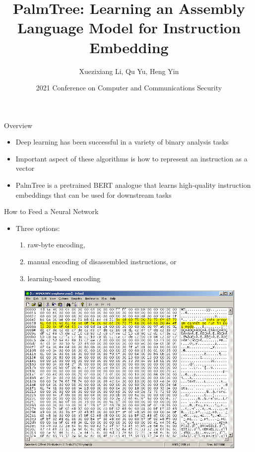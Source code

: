 \documentclass{beamer}
\title[]{PalmTree: Learning an Assembly Language Model for Instruction Embedding}
\author{Xuezixiang Li, Qu Yu, Heng Yin}
\date{2021 Conference on Computer and Communications Security}
\begin{document}
\begin{frame}
  \titlepage
\end{frame}


\begin{frame}{Overview}
	
\begin{itemize}
	\item Deep learning has been successful in a variety of binary analysis tasks
	\item Important aspect of these algorithms is how to represent an instruction as a vector
	\item PalmTree is a pretrained BERT analogue that learns high-quality instruction embeddings that can be used for downstream tasks
\end{itemize}

\end{frame}

\begin{frame}{How to Feed a Neural Network}
	
	\begin{itemize}
		\item Three options: 
		\begin{enumerate}
			\item raw-byte encoding, 
			\item manual encoding of disassembled instructions, or
			\item learning-based encoding
		\end{enumerate}
	\end{itemize}

	\begin{figure}[h]
		\includegraphics[scale=.25]{images/binary-hex-view.png}
	\end{figure}
	
\end{frame}
\end{document}

